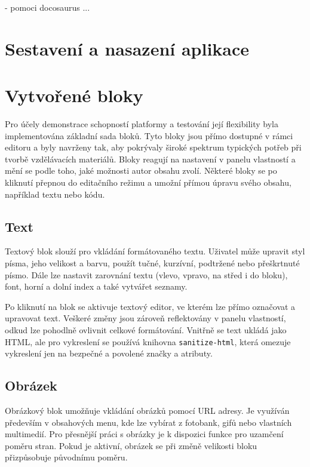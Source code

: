 - pomoci docosaurus
...

\section{Sestavení a nasazení aplikace}

\section{Vytvořené bloky}\label{text:realizace/vytvoreneBloky}

Pro účely demonstrace schopností platformy a testování její flexibility byla implementována základní sada bloků.
Tyto bloky jsou přímo dostupné v rámci editoru a byly navrženy tak, aby pokrývaly široké spektrum typických potřeb při tvorbě vzdělávacích materiálů. 
Bloky reagují na nastavení v panelu vlastností a mění se podle toho, jaké možnosti autor obsahu zvolí. 
Některé bloky se po kliknutí přepnou do editačního režimu a umožní přímou úpravu svého obsahu, například textu nebo kódu. 

\subsection{Text}

Textový blok slouží pro vkládání formátovaného textu. 
Uživatel může upravit styl písma, jeho velikost a barvu, použít tučné, kurzívní, podtržené nebo přeškrtnuté písmo. 
Dále lze nastavit zarovnání textu (vlevo, vpravo, na střed i do bloku), font, horní a dolní index a také vytvářet seznamy. 

Po kliknutí na blok se aktivuje textový editor, ve kterém lze přímo označovat a upravovat text. 
Veškeré změny jsou zároveň reflektovány v panelu vlastností, odkud lze pohodlně ovlivnit celkové formátování. 
Vnitřně se text ukládá jako HTML, ale pro vykreslení se používá knihovna \texttt{sanitize-html}, která omezuje vykreslení jen na bezpečné a povolené značky a atributy.

\subsection{Obrázek}

Obrázkový blok umožňuje vkládání obrázků pomocí URL adresy. 
Je využíván především v obsahových menu, kde lze vybírat z fotobank, gifů nebo vlastních multimedií. 
Pro přesnější práci s obrázky je k dispozici funkce pro uzamčení poměru stran. 
Pokud je aktivní, obrázek se při změně velikosti bloku přizpůsobuje původnímu poměru. 

